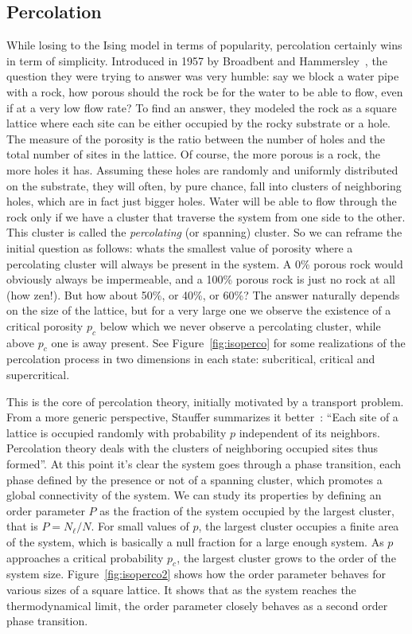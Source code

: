 \subsection{Percolation}
\label{sec:perc}

While losing to the Ising model in terms of popularity, percolation certainly
wins in term of simplicity. Introduced in 1957 by Broadbent and
Hammersley~\cite{Broadbent1957}, the question they were trying to answer was
very humble: say we block a water pipe with a rock, how porous should the rock
be for the water to be able to flow, even if at a very low flow rate? To find
an answer, they modeled the rock as a square lattice where each site can be
either occupied by the rocky substrate or a hole. The measure of the porosity
is the ratio between the number of holes and the total number of sites in the
lattice. Of course, the more porous is a rock, the more holes it has. Assuming
these holes are randomly and uniformly distributed on the substrate, they will
often, by pure chance, fall into clusters of neighboring holes, which are in
fact just bigger holes. Water will be able to flow through the rock only if we
have a cluster that traverse the system from one side to the other. This
cluster is called the \textit{percolating} (or spanning) cluster. So we can
reframe the initial question as follows: whats the smallest value of porosity
where a percolating cluster will always be present in the system. A 0\% porous
rock would obviously always be impermeable, and a 100\% porous rock is just no
rock at all (how zen!). But how about 50\%, or 40\%, or 60\%? The answer
naturally depends on the size of the lattice, but for a very large one we
observe the existence of a critical porosity $p_c$ below which we never observe
a percolating cluster, while above $p_c$ one is away present. See
Figure~\ref{fig:isoperco} for some realizations of the percolation process
in two dimensions in each state: subcritical, critical and supercritical.

This is the core of percolation theory, initially motivated by a transport
problem. From a more generic perspective, Stauffer summarizes it
better~\cite{Stauffer1994}: ``Each site of a lattice is occupied randomly with
probability $p$ independent of its neighbors. Percolation theory deals with the
clusters of neighboring occupied sites thus formed''. At this point it's clear
the system goes through a phase transition, each phase defined by the presence
or not of a spanning cluster, which promotes a global connectivity of the
system. We can study its properties by defining an order parameter $P$ as the
fraction of the system occupied by the largest cluster, that is $P=N_\ell/N$.
For small values of $p$, the largest cluster occupies a finite area of the
system, which is basically a null fraction for a large enough system. As $p$
approaches a critical probability $p_c$, the largest cluster grows to the order
of the system size. Figure~\ref{fig:isoperco2} shows how the order parameter
behaves for various sizes of a square lattice. It shows that as the system
reaches the thermodynamical limit, the order parameter closely behaves as a
second order phase transition.

